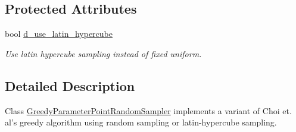 \subsection*{Protected Attributes}
\begin{DoxyCompactItemize}
\item 
\hypertarget{class_c_a_r_o_m_1_1_greedy_parameter_point_random_sampler_a51ebba4567d92b71ef4cc25c2c87d95f}{bool \hyperlink{class_c_a_r_o_m_1_1_greedy_parameter_point_random_sampler_a51ebba4567d92b71ef4cc25c2c87d95f}{d\-\_\-use\-\_\-latin\-\_\-hypercube}}\label{class_c_a_r_o_m_1_1_greedy_parameter_point_random_sampler_a51ebba4567d92b71ef4cc25c2c87d95f}

\begin{DoxyCompactList}\small\item\em Use latin hypercube sampling instead of fixed uniform. \end{DoxyCompactList}\end{DoxyCompactItemize}


\subsection{Detailed Description}
Class \hyperlink{class_c_a_r_o_m_1_1_greedy_parameter_point_random_sampler}{Greedy\-Parameter\-Point\-Random\-Sampler} implements a variant of Choi et. al's greedy algorithm using random sampling or latin-\/hypercube sampling. 

